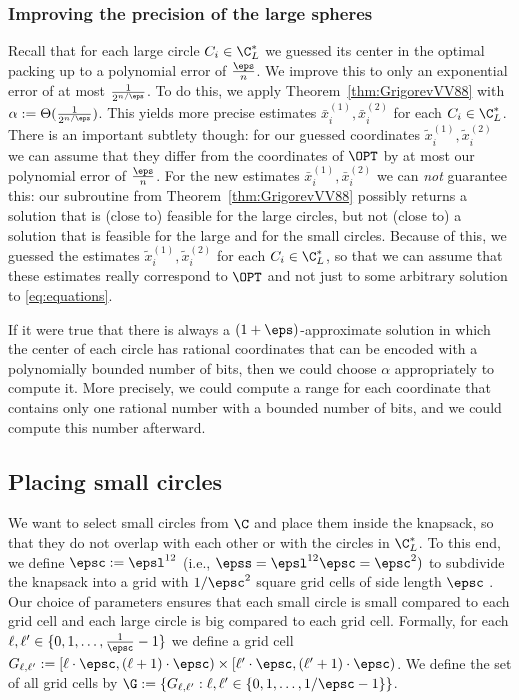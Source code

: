 \subsubsection{Improving the precision of the large spheres}
\label{subsec:Improve_Large} Recall that for each large circle $C_{i}\in\C_{L}^{*}$
we guessed its center in the optimal packing up to a polynomial error
of $\frac{\eps}{n}$. We improve this to only an exponential error
of at most $\frac{1}{2^{n/\eps}}$. To do this, we apply Theorem~\ref{thm:GrigorevVV88}
with $\alpha:=\Theta(\frac{1}{2^{n/\eps}})$. This yields more precise
estimates $\bar{x}_{i}^{(1)},\bar{x}_{i}^{(2)}$ for each $C_{i}\in\C_{L}^{*}$.
There is an important subtlety though: for our guessed coordinates
$\tilde{x}_{i}^{(1)},\tilde{x}_{i}^{(2)}$ we can assume that they
differ from the coordinates of $\OPT$ by at most our polynomial error
of $\frac{\eps}{n}$. For the new estimates $\bar{x}_{i}^{(1)},\bar{x}_{i}^{(2)}$
we can \emph{not }guarantee this: our subroutine from Theorem~\ref{thm:GrigorevVV88}
possibly returns a solution that is (close to) feasible for the
large circles, but not (close to) a solution that is feasible for
the large and for the small circles. Because of this, we guessed the estimates
$\tilde{x}_{i}^{(1)},\tilde{x}_{i}^{(2)}$ for each $C_{i}\in\C_{L}^{*}$,
so that we can assume that these estimates really correspond to $\OPT$
and not just to some arbitrary solution to \eqref{eq:equations}.

If it were true that there is always a $(1+\eps)$-approximate solution
in which the center of each circle has rational coordinates that can
be encoded with a polynomially bounded number of bits, then we could
choose $\alpha$ appropriately to compute it. More precisely, we could
compute a range for each coordinate that contains only one rational
number with a bounded number of bits, and we could compute this number
afterward.


\subsection{Placing small circles}\label{subsec:placing_small}

We want to select small circles from $\C$ and place them inside the
knapsack, so that they do not overlap with each other or
with the circles in $\C_{L}^{*}$. To this end, we define $\epsc := \epsl^{12}$ (i.e., $\epss=\epsl^{12} \epsc = \epsc^2)$ to subdivide the knapsack
into a grid with $1/\epsc^2$ square grid cells of side length $\epsc$ . Our choice of parameters ensures that each small circle is small compared to each grid
cell and each large circle is big compared to each grid cell. Formally, for each $\ell,\ell'\in\{0,1, \dots ,\frac{1}{\epsc}-1\}$
we define a grid cell $G_{\ell,\ell'}:=[\ell\cdot\epsc,(\ell+1)\cdot\epsc)\times[\ell'\cdot\epsc,(\ell'+1)\cdot\epsc)$.
We define the set of all grid cells by $\G:=\{G_{\ell,\ell'}:\ell,\ell'\in\{0,1, \dots ,1/\epsc-1\}\}$.

